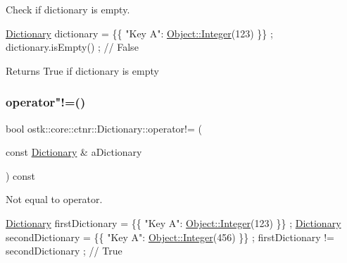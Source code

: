 Check if dictionary is empty. 


\begin{DoxyCode}
\hyperlink{classostk_1_1core_1_1ctnr_1_1_dictionary_a17166f1489683b8fcc5da6537f29de13}{Dictionary} dictionary = \{\{ \textcolor{stringliteral}{"Key A"}: \hyperlink{classostk_1_1core_1_1ctnr_1_1_object_af3bef3ae331e8e55662bf91a4cd5026f}{Object::Integer}(123) \}\} ;
dictionary.isEmpty() ; \textcolor{comment}{// False}
\end{DoxyCode}


\begin{DoxyReturn}{Returns}
True if dictionary is empty 
\end{DoxyReturn}
\mbox{\label{classostk_1_1core_1_1ctnr_1_1_dictionary_abe644044da1fc0c24bd9a4599d4681d1}} 
\subsubsection{\texorpdfstring{operator"!=()}{operator!=()}}
{\footnotesize\ttfamily bool ostk\+::core\+::ctnr\+::\+Dictionary\+::operator!= (\begin{DoxyParamCaption}\item[{const \hyperlink{classostk_1_1core_1_1ctnr_1_1_dictionary}{Dictionary} \&}]{a\+Dictionary }\end{DoxyParamCaption}) const}



Not equal to operator. 


\begin{DoxyCode}
\hyperlink{classostk_1_1core_1_1ctnr_1_1_dictionary_a17166f1489683b8fcc5da6537f29de13}{Dictionary} firstDictionary = \{\{ \textcolor{stringliteral}{"Key A"}: \hyperlink{classostk_1_1core_1_1ctnr_1_1_object_af3bef3ae331e8e55662bf91a4cd5026f}{Object::Integer}(123) \}\} ;
\hyperlink{classostk_1_1core_1_1ctnr_1_1_dictionary_a17166f1489683b8fcc5da6537f29de13}{Dictionary} secondDictionary = \{\{ \textcolor{stringliteral}{"Key A"}: \hyperlink{classostk_1_1core_1_1ctnr_1_1_object_af3bef3ae331e8e55662bf91a4cd5026f}{Object::Integer}(456) \}\} ;
firstDictionary != secondDictionary ; \textcolor{comment}{// True}
\end{DoxyCode}



